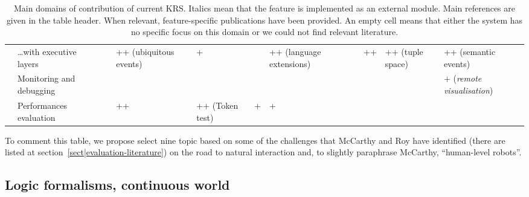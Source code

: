\begin{landscape}
\begin{table}
\begin{center}
\begin{tabular}{p{0.2cm}p{3.4cm}p{1.6cm}p{1.3cm}p{1.7cm}p{1.5cm}p{2cm}p{2cm}p{1.4cm}p{1.8cm}|p{2cm}}
                                                      & \ldots with executive layers &                           & ++ (ubiquitous events)      & +                           &                             & ++ (language extensions) \cite{Beetz2010} &                                          & ++                            & ++ (tuple space)              & ++ (semantic events)                          \\
                                                          & Monitoring and debugging &                           &                             &                             &                             &                                    &                                                 &                               &                               & + ({\em remote visualisation})                \\
                                                           & Performances evaluation &                           & ++ \cite{Hawes2008}         & ++ (Token test)             & +                           & + \cite{Tenorth2011}               &                                                 &                               &                               &                                               \\

\bottomrule

\end{tabular}
\end{center}

\caption{Main domains of contribution of current KRS. Italics mean that the
feature is implemented as an external module. Main references are given in the
table header. When relevant, feature-specific publications have been provided.
An empty cell means that either the system has no specific focus on this domain
or we could not find relevant literature.}

\label{table|contribution-by-systems}
\end{table}
\end{landscape}

To comment this table, we propose select nine topic based on some of the
challenges that McCarthy and Roy have identified (there are listed at
section~\ref{sect|evaluation-literature}) on the road to natural interaction
and, to slightly paraphrase McCarthy, ``human-level robots''.


\subsection{Logic formalisms, continuous world}

